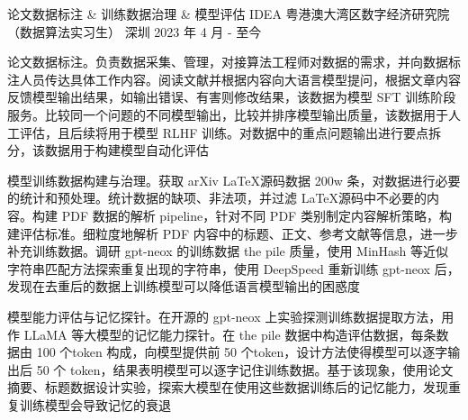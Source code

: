 \begin{cventries}
  \cventry
    {论文数据标注 \& 训练数据治理 \& 模型评估} %
    {IDEA 粤港澳大湾区数字经济研究院（数据算法实习生）} %
    {深圳} %
    {2023 年 4 月 - 至今} %
    {
      \begin{cvitems}
        \item {论文数据标注。负责数据采集、管理，对接算法工程师对数据的需求，并向数据标注人员传达具体工作内容。阅读文献并根据内容向大语言模型提问，根据文章内容反馈模型输出结果，如输出错误、有害则修改结果，该数据为模型 SFT 训练阶段服务。比较同一个问题的不同模型输出，比较并排序模型输出质量，该数据用于人工评估，且后续将用于模型 RLHF 训练。对数据中的重点问题输出进行要点拆分，该数据用于构建模型自动化评估}
        \item {模型训练数据构建与治理。获取 arXiv \LaTeX 源码数据 200w 条，对数据进行必要的统计和预处理。统计数据的缺项、非法项，并过滤 \LaTeX 源码中不必要的内容。构建 PDF 数据的解析 pipeline，针对不同 PDF 类别制定内容解析策略，构建评估标准。细粒度地解析 PDF 内容中的标题、正文、参考文献等信息，进一步补充训练数据。调研 gpt-neox 的训练数据 the pile 质量，使用 MinHash 等近似字符串匹配方法探索重复出现的字符串，使用 DeepSpeed 重新训练 gpt-neox 后，发现在去重后的数据上训练模型可以降低语言模型输出的困惑度}
        \item {模型能力评估与记忆探针。在开源的 gpt-neox 上实验探测训练数据提取方法，用作 LLaMA 等大模型的记忆能力探针。在 the pile 数据中构造评估数据，每条数据由 100 个token 构成，向模型提供前 50 个token，设计方法使得模型可以逐字输出后 50 个 token，结果表明模型可以逐字记住训练数据。基于该现象，使用论文摘要、标题数据设计实验，探索大模型在使用这些数据训练后的记忆能力，发现重复训练模型会导致记忆的衰退}
      \end{cvitems}
    }

\end{cventries}
